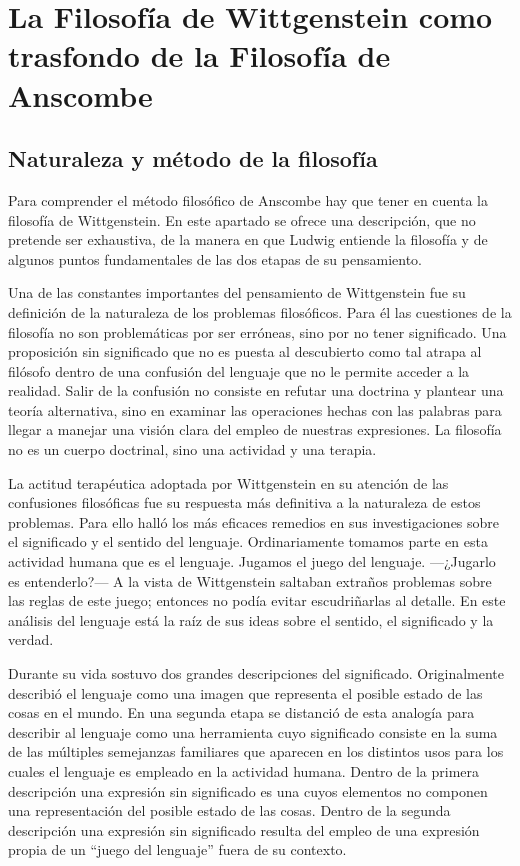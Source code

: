 \section{La Filosofía de Wittgenstein como trasfondo de la Filosofía de Anscombe}

\subsection{Naturaleza y método de la filosofía}

Para comprender el método filosófico de Anscombe hay que tener en cuenta la filosofía de Wittgenstein. En este apartado se ofrece una descripción, que no pretende ser exhaustiva, de la manera en que Ludwig entiende la filosofía y de algunos puntos fundamentales de las dos etapas de su pensamiento.

Una de las constantes importantes del pensamiento de Wittgenstein fue su definición de la naturaleza de los problemas filosóficos. Para él las cuestiones de la filosofía no son problemáticas por ser erróneas, sino por no tener significado\autocite[Cf.~][\S4.003]{wittgenstein1922tractatuses}. Una proposición sin significado que no es puesta al descubierto como tal atrapa al filósofo dentro de una confusión del lenguaje que no le permite acceder a la realidad. Salir de la confusión no consiste en refutar una doctrina y plantear una teoría alternativa, sino en examinar las operaciones hechas con las palabras para llegar a manejar una visión clara del empleo de nuestras expresiones. La filosofía no es un cuerpo doctrinal, sino una actividad\autocite[Cf.~][\S4.112]{wittgenstein1922tractatuses} y una terapia\autocite[Cf.~][\S133]{wittgenstein1953phiinv}.

La actitud terapéutica adoptada por Wittgenstein en su atención de las confusiones filosóficas fue su respuesta más definitiva a la naturaleza de estos problemas. Para ello halló los más eficaces remedios en sus investigaciones sobre el significado y el sentido del lenguaje. Ordinariamente tomamos parte en esta actividad humana que es el lenguaje. Jugamos el juego del lenguaje. ---¿Jugarlo es entenderlo?--- A la vista de Wittgenstein saltaban extraños problemas sobre las reglas de este juego; entonces no podía evitar escudriñarlas al detalle\autocite[Cf.~][356]{monk1991duty}. En este análisis del lenguaje está la raíz de sus ideas sobre el sentido, el significado y la verdad.

Durante su vida sostuvo dos grandes descripciones del significado. Originalmente describió el lenguaje como una imagen que representa el posible estado de las cosas en el mundo. En una segunda etapa se distanció de esta analogía para describir al lenguaje como una herramienta cuyo significado consiste en la suma de las múltiples semejanzas familiares que aparecen en los distintos usos para los cuales el lenguaje es empleado en la actividad humana. Dentro de la primera descripción una expresión sin significado es una cuyos elementos no componen una representación del posible estado de las cosas. Dentro de la segunda descripción una expresión sin significado resulta del empleo de una expresión propia de un ``juego del lenguaje'' fuera de su contexto.

